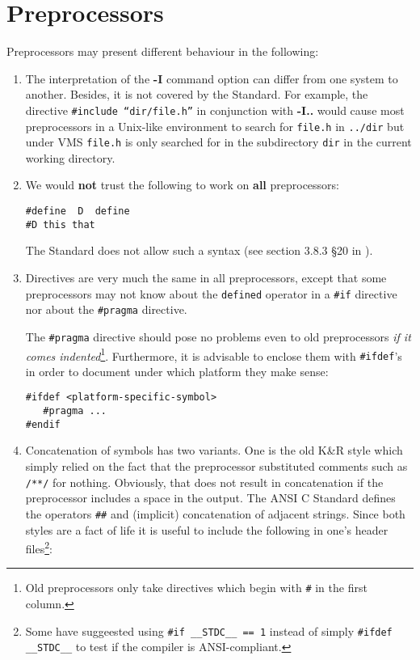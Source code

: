 \section{Preprocessors}

Preprocessors may present different behaviour in the following:

\begin{enumerate}

\item The interpretation of the {\bf -I} command option can differ from
 one system to another. Besides, it is not covered by the Standard. For
 example, the directive {\tt \#include ``dir/file.h''} in conjunction with
 {\bf -I..} would cause most preprocessors in a Unix-like environment
 to search for {\tt file.h} in {\tt ../dir} but under VMS {\tt file.h}
 is only searched for in the subdirectory {\tt dir} in the current
 working directory.

\item We would {\bf not} trust the following to work on {\bf all}
 preprocessors:

\begin{verbatim}
#define  D  define
#D this that
\end{verbatim}

The Standard does not allow such a syntax (see section 3.8.3 \S 20
 in \cite{kn:ansi}).

\item Directives are very much the same in all preprocessors, except that
 some preprocessors may not know about the {\tt defined} operator in a
 {\tt \#if} directive nor about the {\tt \#pragma} directive.

 The {\tt \#pragma} directive should pose no problems even to old
 preprocessors {\em if it comes indented}\footnote{Old preprocessors
 only take directives which begin with {\tt \#} in the first column.}.
 Furthermore, it is advisable to
 enclose them with {\tt \#ifdef}'s in order to document under which
 platform they make sense:
\begin{verbatim}
#ifdef <platform-specific-symbol>
   #pragma ...
#endif
\end{verbatim}

\item Concatenation of symbols has two variants. One is the old K\&R style
 which simply relied on the fact that the preprocessor substituted
 comments such as {\tt /**/} for nothing. Obviously, that does not result
 in concatenation
 if the preprocessor includes a space in the output.
 The ANSI C Standard defines the operators {\tt \#\#} and 
 (implicit) concatenation of adjacent strings. Since both
 styles are a fact of life it is useful to include the following in one's
 header files\footnote{Some have suggeested using {\tt \#if \_\_STDC\_\_ ==
 1}
 instead of simply {\tt \#ifdef \_\_STDC\_\_} to test if the compiler
is ANSI-compliant.}:


\end{enumerate}
